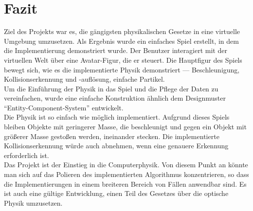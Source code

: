 \documentclass[
  10pt,
  a4paper,
  oneside,
  headers,
  headinclude,
  footinclude,
  BCOR5mm,
]{article}
\begin{document}
\section{Fazit}
Ziel des Projekts war es, die gängigsten physikalischen Gesetze in eine
virtuelle Umgebung umzusetzen. Als Ergebnis wurde ein einfaches Spiel erstellt,
in dem die Implementierung demonstriert wurde. Der Benutzer interagiert mit der
virtuellen Welt über eine Avatar-Figur, die er steuert. Die Hauptfigur des
Spiels bewegt sich, wie es die implementierte Physik demonstriert ---
Beschleunigung, Kollisionserkennung und -auflösung, einfache Partikel. \\
Um die Einführung der Physik in das Spiel und die Pflege der Daten zu
vereinfachen, wurde eine einfache Konstruktion ähnlich dem Designmuster
``Entity-Component-System'' entwickelt. \\
Die Physik ist so einfach wie möglich implementiert. Aufgrund dieses Spiels
bleiben Objekte mit geringerer Masse, die beschleunigt und gegen ein Objekt mit
größerer Masse gestoßen werden, ineinander stecken. Die implementierte
Kollisionserkennung würde auch abnehmen, wenn eine genauere Erkennung
erforderlich ist. \\
Das Projekt ist der Einstieg in die Computerphysik. Von diesem Punkt an könnte
man sich auf das Polieren des implementierten Algorithmus konzentrieren, so dass
die Implementierungen in einem breiteren Bereich von Fällen anwendbar sind. Es
ist auch eine gültige Entwicklung, einen Teil des Gesetzes über die optische
Physik umzusetzen.
\end{document}
